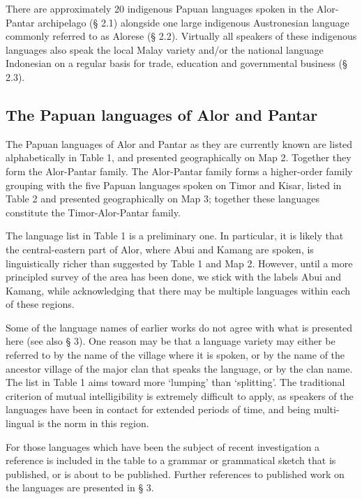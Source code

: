 There are approximately 20 indigenous Papuan languages spoken in the Alor-Pantar archipelago ({\S} 2.1) alongside one large indigenous Austronesian language commonly referred to as Alorese ({\S} 2.2). Virtually all speakers of these indigenous languages also speak the local Malay variety and/or the national language Indonesian on a regular basis for trade, education and governmental business ({\S} 2.3).

\subsection{The Papuan languages of Alor and Pantar}
The Papuan languages of Alor and Pantar as they are currently known are listed alphabetically in Table 1, and presented geographically on Map 2. Together they form the Alor-Pantar family. The Alor-Pantar family forms a higher-order family grouping with the five Papuan languages spoken on Timor and Kisar, listed in Table 2 and presented geographically on Map 3; together these languages constitute the Timor-Alor-Pantar family.

The language list in Table 1 is a preliminary one. In particular, it is likely that the central-eastern part of Alor, where Abui and Kamang are spoken, is linguistically richer than suggested by Table 1 and Map 2. However, until a more principled survey of the area has been done, we stick with the labels Abui and Kamang, while acknowledging that there may be multiple languages within each of these regions.

Some of the language names of earlier works \citep[e.g.][]{Stokhof1975,GrimesEtAl1997,LewisEtAl2013} do not agree with what is presented here (see also {\S} 3). One reason may be that a language variety may either be referred to by the name of the village where it is spoken, or by the name of the ancestor village of the major clan that speaks the language, or by the clan name. The list in Table 1 aims toward more `lumping' than `splitting'. The traditional criterion of mutual intelligibility is extremely difficult to apply, as speakers of the languages have been in contact for extended periods of time, and being multi-lingual is the norm in this region.

For those languages which have been the subject of recent investigation a reference is included in the table to a grammar or grammatical sketch that is published, or is about to be published. Further references to published work on the languages are presented in {\S} 3.



